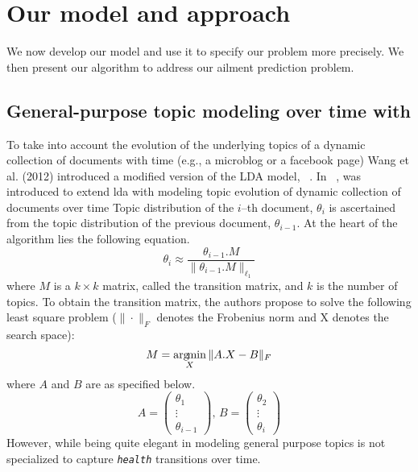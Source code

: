 \section{Our model and approach}
\label{sec:approach}
We now develop our model and use it to specify our problem more
precisely. We then present our algorithm to address our ailment
prediction problem.

\subsection{General-purpose topic modeling over time with \tmlda}
To take into account the evolution of the underlying topics of a
dynamic collection of documents with time (e.g., a microblog or a
facebook page) Wang et al. (2012) introduced a modified version of the
LDA model, \tmlda~\cite{DBLP:conf/kdd/WangAB12}.
In ~\cite{DBLP:conf/kdd/WangAB12}, \tmlda was introduced to extend
lda with modeling topic evolution of dynamic collection of documents over time
 Topic distribution
of the $i$--th document, $\theta_i$  is ascertained from 
the topic distribution of the previous document, $\theta_{i-1}$.
At the heart of the algorithm lies the following equation.
\begin{equation}
	\label{eq:tmlda:basic}
	\theta_{i}\approx\frac{\theta_{i-1}.M}{\|\theta_{i-1}.M\|_{\ell_1}}
\end{equation}
where $M$ is a $k\times k$ matrix, called the transition
matrix, and $k$ is the number of topics. To obtain the transition matrix, 
the authors propose to solve the following least square
problem ($\|\cdot\|_F$ denotes the Frobenius norm and X denotes the search space):
\begin{equation}
	\label{eq:tmlda:train}
	M=\operatorname*{arg\!min}_X{\|A.X-B\|_F}
\end{equation}
where $A$ and $B$ are as specified below.
\begin{equation}
	\label{eq:tmlda:vectors}
	A=\begin{pmatrix}\theta_{1}\\\vdots\\\theta_{i-1}\end{pmatrix},\,B=\begin{pmatrix}\theta_{2}\\\vdots\\\theta_{i}\end{pmatrix}
\end{equation}
However, while being quite elegant in modeling general purpose topics
\tmlda is not specialized to capture \texttt{\emph{health}} transitions
over time.
